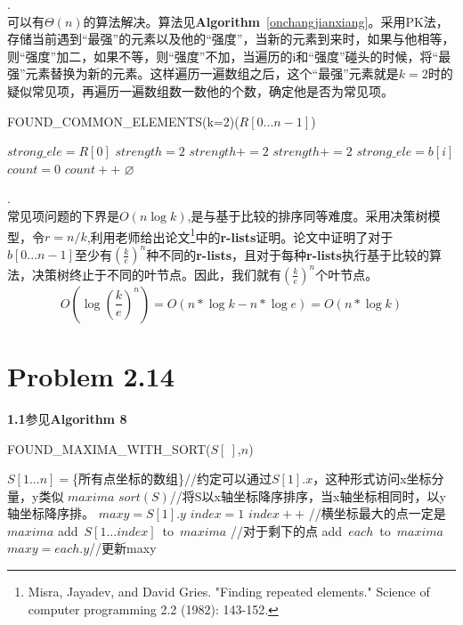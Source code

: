 \documentclass[twocolumn]{ctexart}
\begin{document}
.\\
\indent 可以有$\Theta(n)$的算法解决。算法见\textbf{Algorithm}\ \ref{onchangjianxiang}。采用PK法，存储当前遇到“最强”的元素以及他的“强度”，当新的元素到来时，如果与他相等，则“强度”加二，如果不等，则“强度”不加，当遍历的i和“强度”碰头的时候，将“最强”元素替换为新的元素。这样遍历一遍数组之后，这个“最强”元素就是$k=2$时的疑似常见项，再遍历一遍数组数一数他的个数，确定他是否为常见项。\\
\begin{algorithm}[htbp]
	\caption{FOUND\_COMMON\_ELEMENTS(k=2)($R[0...n-1]$)}
	\label{onchangjianxiang}
	\begin{algorithmic}[1]
		\STATE  $strong\_ele=R[0]$
		\STATE $strength=2$
				\STATE $strength+=2$
				\STATE $strength+=2$
				\STATE $strong\_ele=b[i]$
			\ENDIF
		\ENDFOR
		\STATE $count=0$
				\STATE $count++$
			\ENDIF
		\ENDFOR	
		\ELSE
			\RETURN $\varnothing$
		\ENDIF
	\end{algorithmic}
\end{algorithm}


.\\
\indent 常见项问题的下界是$O(n\log{k})$,是与基于比较的排序同等难度。采用决策树模型，令$r=n/k$,利用老师给出论文\footnote{Misra, Jayadev, and David Gries. "Finding repeated elements." Science of computer programming 2.2 (1982): 143-152.}中的\textbf{r-lists}证明。论文中证明了对于$b[0...n-1]$至少有$(\frac{k}{e})^n$种不同的\textbf{r-lists}，且对于每种\textbf{r-lists}执行基于比较的算法，决策树终止于不同的叶节点。因此，我们就有$(\frac{k}{e})^n$个叶节点。\\
\[
	O(\log{(\frac{k}{e})^n})=O(n*\log{k}-n*\log{e})=O(n*\log{k})
\]

\section*{Problem 2.14}
\noindent \textbf{1.1}参见\textbf{Algorithm 8}\\
\begin{algorithm}[htbp]
	\caption{FOUND\_MAXIMA\_WITH\_SORT($S[\ ]$,$n$)}
	\begin{algorithmic}[1]
		\REQUIRE $S[1...n]=$\{所有点坐标的数组\}//约定可以通过$S[1].x$，这种形式访问x坐标分量，y类似
		\ENSURE $maxima$
		\STATE $sort(S)$//将S以x轴坐标降序排序，当x轴坐标相同时，以y轴坐标降序排。
		\STATE $maxy=S[1].y$
		\STATE $index=1$
			\STATE $index++$
		\ENDWHILE
		\STATE  //横坐标最大的点一定是$maxima$
		\STATE add\ $S[1...index]$\ to\ $maxima$
		\STATE //对于剩下的点
				\STATE add\ $each$\ to\ $maxima$
				\STATE $maxy=each.y$//更新maxy
			\ENDIF
		\ENDFOR		
	\end{algorithmic}
\end{algorithm}
\end{document}
